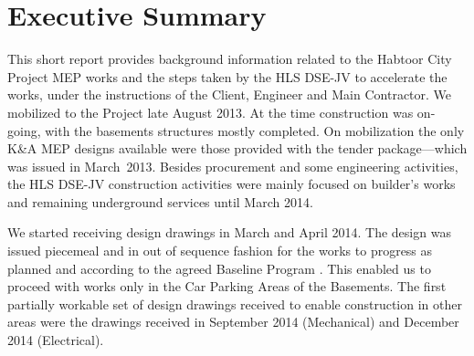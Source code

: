 %
\def\thesubsubsection{}         
\def\JV{HLS DSE-JV\xspace}
\def\letter#1{\texttt{HLSDSEJV/HC/L/YL/#1}\xspace}
\def\KA{K\&A}
\def\DT#1{HLG Transmittal Ref. No.: \texttt{HLG-626-DT-HLS-#1}\xspace}
\def\idxbusbar#1{\index{Busbar Delays>#1}}
\def\idxwestin#1{\index{Westin Delays>#1}}
\def\idxstregis#1{\index{St. Regis Delays>#1}}
\def\idxahu#1{\index{Air Handling Unit Delays>#1}}
\let\idxahus\idxahu
\def\CAR#1{\index{Cost Adjustment Requests>CAR-#1}{\texttt{CAR-#1}}\xspace}
\def\idxbasement#1{\index{Basement delays>#1}}
\let\basement\idxbasement
\def\idxdewa#1{\index{Dewa Approvals>#1}}


\mainmatter

\chapter{Executive Summary}

This short report provides background information related to  the Habtoor City Project MEP works and the steps taken by the \JV to accelerate the works, under the instructions of the Client, Engineer and Main Contractor.  We mobilized to the Project late August 2013. At the time construction was on-going, with the basements structures mostly completed. On mobilization the only K\&A MEP designs available were those provided with the tender package---which was issued in March~2013. Besides procurement and some engineering activities, the \JV  construction activities were mainly focused on builder's works and remaining underground services until March 2014. 

We started receiving design drawings in March and April 2014. The design was issued piecemeal and in out of sequence fashion for the works to progress as planned and according to the agreed Baseline Program . This enabled us to proceed with works only in the Car Parking Areas of the Basements.  The first partially workable set of design drawings received to enable construction in other areas were the drawings received in September 2014 (Mechanical) and December 2014 (Electrical).


\medskip
		
